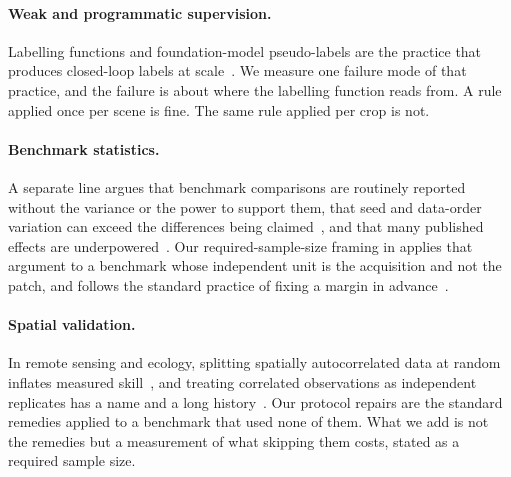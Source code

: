 \paragraph{Weak and programmatic supervision.} Labelling functions and
foundation-model pseudo-labels are the practice that produces closed-loop labels at
scale~\cite{ratner2017snorkel}. We measure one failure mode of that practice, and
the failure is about where the labelling function reads from. A rule applied once per scene is
fine. The same rule applied per crop is not.

\paragraph{Benchmark statistics.} A separate line argues that benchmark comparisons
are routinely reported without the variance or the power to support them, that seed
and data-order variation can exceed the differences being
claimed~\cite{bouthillier2021accounting, reimers2017reporting}, and that many
published effects are underpowered~\cite{card2020little, damour2022underspecification}.
Our required-sample-size framing in  applies that argument to
a benchmark whose independent unit is the acquisition and not the patch, and follows
the standard practice of fixing a margin in advance~\cite{lakens2017equivalence}.

\paragraph{Spatial validation.} In remote sensing and ecology, splitting
spatially autocorrelated data at random inflates measured
skill~\cite{roberts2017cross, ploton2020spatial}, and treating correlated
observations as independent replicates has a name and a long
history~\cite{hurlbert1984pseudoreplication}. Our protocol repairs are the standard
remedies applied to a benchmark that used none of them. What we add is not the
remedies but a measurement of what skipping them costs, stated as a required sample
size.
